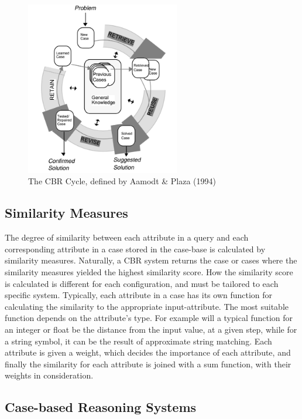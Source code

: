 \begin{figure}[H]
    \centering
    \includegraphics[width=0.6\textwidth]{fig/cbr_cycle.png}
    \caption{The CBR Cycle, defined by Aamodt \& Plaza (1994)\cite{aamodt1994case}}
    \label{fig:cbr_cycle}
\end{figure}

\subsection{Similarity Measures}

The degree of similarity between each attribute in a query and each corresponding attribute in a case stored in the case-base is calculated by similarity measures. Naturally, a CBR system returns the case or cases where the similarity measures yielded the highest similarity score. How the similarity score is calculated is different for each configuration, and must be tailored to each specific system. Typically, each attribute in a case has its own function for calculating the similarity to the appropriate input-attribute. The most suitable function depends on the attribute's type. For example will a typical function for an integer or float be the distance from the input value, at a given step, while for a string symbol, it can be the result of approximate string matching. Each attribute is given a weight, which decides the importance of each attribute, and finally the similarity for each attribute is joined with a sum function, with their weights in consideration.

\subsection{Case-based Reasoning Systems}

